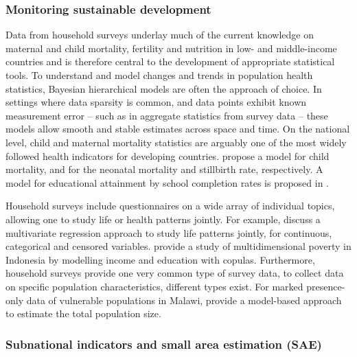 \subsubsection*{Monitoring sustainable development}\label{sec:monitoring-sustainable-development}

Data from household surveys underlay much of the current knowledge on maternal and child mortality, fertility and nutrition in low- and middle-income countries and is therefore central to the development of appropriate statistical tools. To understand and model changes and trends in population health statistics, Bayesian hierarchical models are often the approach of choice. In settings where data sparsity is common, and data points exhibit known measurement error -- such as in aggregate statistics from survey data -- these models allow smooth and stable estimates across space and time. On the national level, child and maternal mortality statistics are arguably one of the most widely followed health indicators for developing countries. \textcite{alkemaGlobalEstimationChild2014} propose a model for child mortality, \textcite{alexanderGlobalEstimationNeonatal2018} and \textcite{wangEstimatingStillbirthRate2022} for the neonatal mortality and stillbirth rate, respectively. A model for educational attainment by school completion rates is proposed in \textcite{dharamshiBayesianModelEstimating2022}.

Household surveys include questionnaires on a wide array of individual topics, allowing one to study life or health patterns jointly. For example, \textcite{wadeColombianWomenLife2022} discuss a multivariate regression approach to study life patterns jointly, for continuous, categorical and censored variables. \textcite{hohbergUnidimensionalPovertyAnalysis2021} provide a study of multidimensional poverty in Indonesia by modelling income and education with copulas. Furthermore, household surveys provide one very common type of survey data, to collect data on specific population characteristics, different types exist. For marked presence-only data of vulnerable populations in Malawi, \textcite{lagaModelingMarkedPresenceOnly2022} provide a model-based approach to estimate the total population size.


\subsubsection*{Subnational indicators and small area estimation (SAE)}\label{sec:subnational-indicators-and-small-area-estimation-sae}


